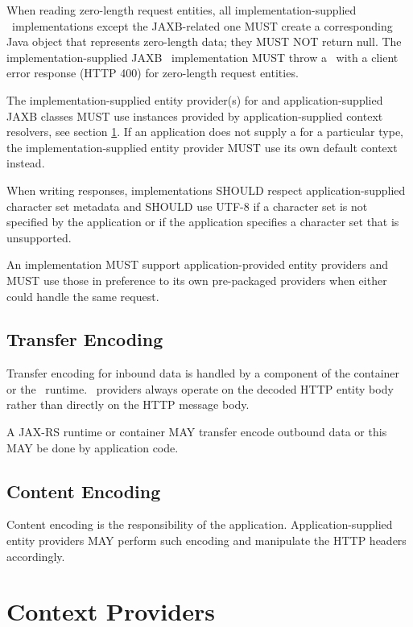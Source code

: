 When reading zero-length request entities, all implementation-supplied \MsgRead\ implementations except the JAXB-related one MUST create a corresponding Java object that represents zero-length data; they MUST NOT return null. The implementation-supplied JAXB \MsgRead\ implementation MUST throw a \WebAppExc\ with a client error response (HTTP 400) for zero-length request entities.

The implementation-supplied entity provider(s) for  and application-supplied JAXB classes MUST use  instances provided by application-supplied context resolvers, see section \ref{contextprovider}. If an application does not supply a  for a particular type, the implementation-supplied entity provider MUST use its own default context instead.

When writing responses, implementations SHOULD respect application-supplied character set metadata and SHOULD use UTF-8 if a character set is not specified by the application or if the application specifies a character set that is unsupported.

An implementation MUST support application-provided entity providers and MUST use those in preference to its own pre-packaged providers when either could handle the same request.

\subsection{Transfer Encoding}
\label{transfer_encoding}

Transfer encoding for inbound data is handled by a component of the container or the \jaxrs\ runtime. \MsgRead\ providers always operate on the decoded HTTP entity body rather than directly on the HTTP message body.

A JAX-RS runtime or container MAY transfer encode outbound data or this MAY be done by application code.

\subsection{Content Encoding}

Content encoding is the responsibility of the application. Application-supplied entity providers MAY perform such encoding and manipulate the HTTP headers accordingly.

\section{Context Providers}
\label{contextprovider}

